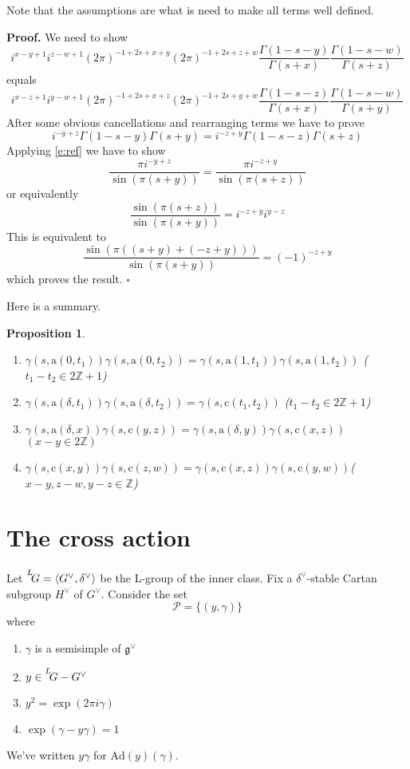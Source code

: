 \documentclass[10pt,leqno]{article}
\newtheorem{proposition}[equation]{Proposition}
\renewcommand{\sec}[1]{\section{#1}
\renewcommand{\theequation}{\thesection.\arabic{equation}}
  \setcounter{equation}{0}}
\newcommand{\qed}{\hfill $\square$ \medskip}
\newenvironment{proof}[1][Proof]{\noindent\textbf{#1.} }{\qed}
\newcommand{\Ad}{\mathrm{Ad}}
\newcommand{\Z}{\mathbb Z}
\renewcommand{\P}{\mathcal P}
\renewcommand{\a}{\mathfrak a}
\newcommand{\ch}[1]{#1^\vee}
\newcommand{\g}{\mathfrak g}
\renewcommand{\a}{\mathrm a}
\renewcommand{\c}{\mathrm c}
\newcommand{\LG}{\overset{L}{\vphantom{a}}\negthinspace G}
\begin{document}
Note that the assumptions are what is need to make all terms well defined.

\begin{proof}
  We need to show
$$
  i^{x-y+1}i^{z-w+1}(2\pi)^{-1+2s+x+y}(2\pi)^{-1+2s+z+w}\frac{\Gamma(1-s-y)}{\Gamma(s+x)}\frac{\Gamma(1-s-w)}{\Gamma(s+z)}
  $$
  equals
$$
i^{x-z+1}i^{y-w+1}(2\pi)^{-1+2s+x+z}(2\pi)^{-1+2s+y+w}\frac{\Gamma(1-s-z)}{\Gamma(s+x)}\frac{\Gamma(1-s-w)}{\Gamma(s+y)}
$$
After some obvious cancellations and rearranging terms we have to prove
$$
i^{-y+z}\Gamma(1-s-y)\Gamma(s+y)=
i^{-z+y}\Gamma(1-s-z)\Gamma(s+z)
$$
Applying \eqref{e:ref} we have to show
$$
\frac{\pi i^{-y+z}}{\sin(\pi(s+y))}
=
\frac{\pi i^{-z+y}}{\sin(\pi(s+z))}
$$
or equivalently
$$
\frac{\sin(\pi(s+z))}{\sin(\pi(s+y))}=i^{-z+y}i^{y-z}
$$
This is equivalent to
$$
\frac{\sin(\pi((s+y)+(-z+y)))}{\sin(\pi(s+y))}=(-1)^{-z+y}
$$
which proves the result.
\end{proof}

Here is a summary.

\begin{proposition}
\hfil

\begin{enumerate}
\item $\gamma(s,\a(0,t_1))\gamma(s,\a(0,t_2))=\gamma(s,\a(1,t_1))\gamma(s,\a(1,t_2))$ \quad($t_1-t_2\in2\Z+1$)
\item $\gamma(s,\a(\delta,t_1))\gamma(s,\a(\delta,t_2))=\gamma(s,\c(t_1,t_2))$ \quad($t_1-t_2\in2\Z+1$)
\item   $  \gamma(s,\a(\delta,x))\gamma(s,\c(y,z))=\gamma(s,\a(\delta,y))\gamma(s,\c(x,z))$ \quad$(x-y\in2\Z)$
\item 
$\gamma(s,\c(x,y))\gamma(s,\c(z,w))=\gamma(s,\c(x,z))\gamma(s,\c(y,w))$\quad(
$x-y,z-w,y-z\in\Z$)
\end{enumerate}
\end{proposition}

\sec{The cross action}

Let $\LG=\langle \ch G,\ch\delta\rangle$ be the L-group of the inner class. 
Fix a $\ch\delta$-stable Cartan subgroup $\ch H$ of $\ch G$.
Consider the set
$$
\P=\{(y,\gamma)\}
$$
where
\begin{enumerate}
\item $\gamma$ is a semisimple of $\ch\g$
\item $y\in \LG-\ch G$
\item $y^2=\exp(2\pi i\gamma)$
\item $\exp(\gamma-y\gamma)=1$
\end{enumerate}
We've written $y\gamma$ for $\Ad(y)(\gamma)$. 
\end{document}
